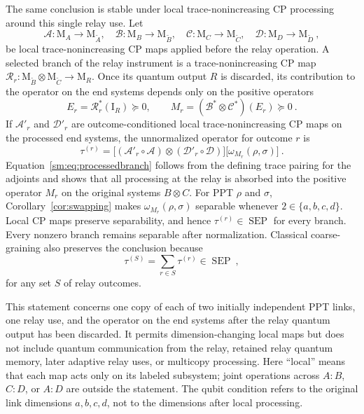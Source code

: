 \documentclass[aps,prl,reprint,superscriptaddress,nofootinbib]{revtex4-2}
\newcommand{\M}{\mathrm{M}}
\newcommand{\I}{\mathrm{I}}
\newcommand{\SEP}{\operatorname{SEP}}
\begin{document}
The same conclusion is stable under local trace-nonincreasing CP processing
around this single relay use.  Let
\begin{equation}
 \mathcal A:\M_A\to\M_{\widetilde A},\quad
 \mathcal B:\M_B\to\M_{\widetilde B},\quad
 \mathcal C:\M_C\to\M_{\widetilde C},\quad
 \mathcal D:\M_D\to\M_{\widetilde D}\ ,
\label{sm:eq:localpreprocessing}
\end{equation}
be local trace-nonincreasing CP maps applied before the relay operation.
A selected branch of the relay instrument is a trace-nonincreasing CP map
\(\mathcal R_r:\M_{\widetilde B}\otimes\M_{\widetilde C}\to\M_R\).
Once its quantum output \(R\) is discarded, its contribution to the
operator on the end systems depends only on the positive operators
\begin{equation}
 E_r=\mathcal R_r^*(\I_R)\succeq0,
 \qquad
 M_r=(\mathcal B^*\otimes\mathcal C^*)(E_r)\succeq0\ .
\label{sm:eq:instrumentpullback}
\end{equation}
If \(\mathcal A'_r\) and \(\mathcal D'_r\) are outcome-conditioned local
trace-nonincreasing CP maps on the processed end systems, the unnormalized
operator for outcome \(r\) is
\begin{equation}
 \tau^{(r)}=
 \bigl[(\mathcal A'_r\circ\mathcal A)\otimes
  (\mathcal D'_r\circ\mathcal D)\bigr]
 \bigl[\omega_{M_r}(\rho,\sigma)\bigr]\ .
\label{sm:eq:processedbranch}
\end{equation}
Equation~\eqref{sm:eq:processedbranch} follows from the defining trace pairing
for the adjoints and shows that all processing at the relay is absorbed into
the positive operator \(M_r\) on the original systems \(B\otimes C\).
For PPT \(\rho\) and \(\sigma\), Corollary~\ref{cor:swapping} makes
\(\omega_{M_r}(\rho,\sigma)\) separable whenever
\(2\in\{a,b,c,d\}\).  Local CP maps preserve separability, and hence
\(\tau^{(r)}\in\SEP\) for every branch.  Every nonzero branch remains
separable after normalization.  Classical coarse-graining also preserves
the conclusion because
\begin{equation}
 \tau^{(S)}=\sum_{r\in S}\tau^{(r)}\in\SEP\ ,
\label{sm:eq:classicalcoarsegraining}
\end{equation}
for any set \(S\) of relay outcomes.

This statement concerns one copy of each of two initially independent PPT
links, one relay use, and the operator on the end systems after the relay
quantum output has been discarded.  It permits dimension-changing local maps but
does not include quantum communication from the relay, retained relay
quantum memory, later adaptive relay uses, or multicopy processing.  Here
``local'' means that each map acts only on its labeled subsystem; joint
operations across \(A{:}B\), \(C{:}D\), or \(A{:}D\) are outside the
statement.  The qubit condition refers to the original link dimensions
\(a,b,c,d\), not to the dimensions after local processing.
\end{document}
